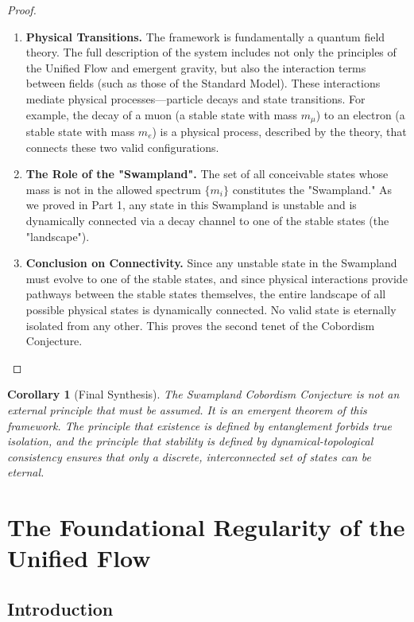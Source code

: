 \documentclass[11pt, letterpaper]{report}
\theoremstyle{plain} %
\newtheorem{corollary}[theorem]{Corollary}
\theoremstyle{definition} %
\theoremstyle{remark} %
\begin{document}
\begin{proof}
\begin{enumerate}
    \item \textbf{Physical Transitions.} The framework is fundamentally a quantum field theory. The full description of the system includes not only the principles of the Unified Flow and emergent gravity, but also the interaction terms between fields (such as those of the Standard Model). These interactions mediate physical processes—particle decays and state transitions. For example, the decay of a muon (a stable state with mass $m_\mu$) to an electron (a stable state with mass $m_e$) is a physical process, described by the theory, that connects these two valid configurations.

    \item \textbf{The Role of the "Swampland".} The set of all conceivable states whose mass is not in the allowed spectrum $\{m_i\}$ constitutes the "Swampland." As we proved in Part 1, any state in this Swampland is unstable and is dynamically connected via a decay channel to one of the stable states (the "landscape").

    \item \textbf{Conclusion on Connectivity.} Since any unstable state in the Swampland must evolve to one of the stable states, and since physical interactions provide pathways between the stable states themselves, the entire landscape of all possible physical states is dynamically connected. No valid state is eternally isolated from any other. This proves the second tenet of the Cobordism Conjecture.
\end{enumerate}
\end{proof}

\begin{corollary}[Final Synthesis]
The Swampland Cobordism Conjecture is not an external principle that must be assumed. It is an emergent theorem of this framework. The principle that existence is defined by entanglement forbids true isolation, and the principle that stability is defined by dynamical-topological consistency ensures that only a discrete, interconnected set of states can be eternal.
\end{corollary}






\section{The Foundational Regularity of the Unified Flow}
\label{sec:flow_regularity}

\subsection{Introduction}
\end{document}

